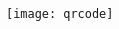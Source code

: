 \documentclass[10pt,A4]{article}
\newcommand{\mpwidth}{\linewidth-\fboxsep-\fboxsep}
\newcommand{\cvtext}[1] {
	\begin{tabular*}{1\mpwidth}{p{0.98\mpwidth}}
		\parbox{1\mpwidth}{#1}
	\end{tabular*}
}
\newcommand{\cvsection}[1] {
	\vspace{5pt}
	\cvtext{
		\textbf{\LARGE{\textcolor{darkcol}{\uppercase{#1}}}}\\[-4pt]
		\textcolor{maincol}{ \rule{0.1\textwidth}{2pt} } \\
	}
}
\newcommand{\cvmetaevent}[4] {
	\textcolor{maincol} {\cvtext{\textbf{\begin{flushleft}#1\end{flushleft}}}}

	\ifthenelse{\isempty{#2}}{}{
	\textcolor{darkcol} {\cvtext{\textbf{#2}} }
	}

	\ifthenelse{\isempty{#3}}{}{
		\cvtext{{ \textcolor{darkcol} {#3} }}\\
	}

	\cvtext{#4}\\[14pt]
}
\newcommand{\cvqrcode}[1] {
	\begin{center}
		\texttt{[image: qrcode]}
	\end{center}
}
\begin{document}
\begin{paracol}{2}
\begin{leftcolumn}
\vfill\null
\cvqrcode{0.8}

%
%
%
%
%

%
%
%
%
%
%


\end{leftcolumn}
\end{paracol}
\end{document}
